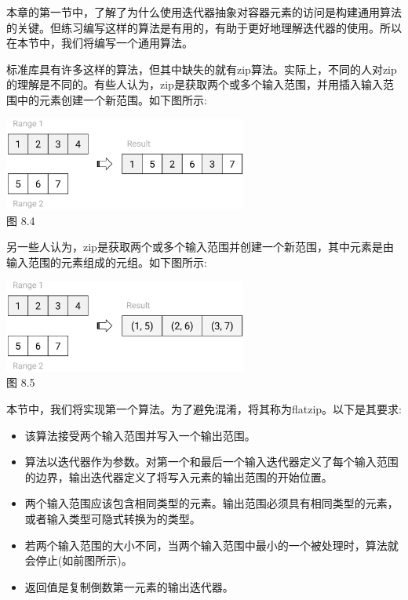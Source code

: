 
本章的第一节中，了解了为什么使用迭代器抽象对容器元素的访问是构建通用算法的关键。但练习编写这样的算法是有用的，有助于更好地理解迭代器的使用。所以在本节中，我们将编写一个通用算法。

标准库具有许多这样的算法，但其中缺失的就有zip算法。实际上，不同的人对zip的理解是不同的。有些人认为，zip是获取两个或多个输入范围，并用插入输入范围中的元素创建一个新范围。如下图所示:

\begin{center}
\includegraphics[width=0.6\textwidth]{content/3/chapter8/images/4.png}\\
图 8.4
\end{center}

另一些人认为，zip是获取两个或多个输入范围并创建一个新范围，其中元素是由输入范围的元素组成的元组。如下图所示:

\begin{center}
\includegraphics[width=0.6\textwidth]{content/3/chapter8/images/5.png}\\
图 8.5
\end{center}

本节中，我们将实现第一个算法。为了避免混淆，将其称为flatzip。以下是其要求:

\begin{itemize}
\item
该算法接受两个输入范围并写入一个输出范围。

\item
算法以迭代器作为参数。对第一个和最后一个输入迭代器定义了每个输入范围的边界，输出迭代器定义了将写入元素的输出范围的开始位置。

\item
两个输入范围应该包含相同类型的元素。输出范围必须具有相同类型的元素，或者输入类型可隐式转换为的类型。

\item
若两个输入范围的大小不同，当两个输入范围中最小的一个被处理时，算法就会停止(如前图所示)。

\item
返回值是复制倒数第一元素的输出迭代器。
\end{itemize}

